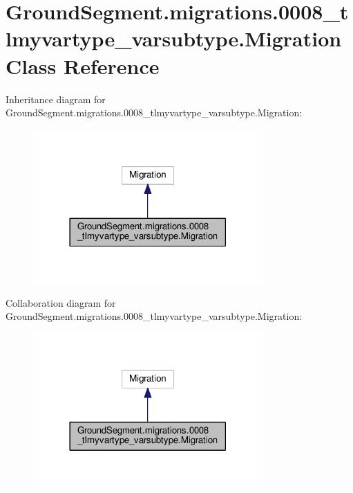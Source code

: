 \hypertarget{class_ground_segment_1_1migrations_1_10008__tlmyvartype__varsubtype_1_1_migration}{}\section{Ground\+Segment.\+migrations.0008\+\_\+tlmyvartype\+\_\+varsubtype.Migration Class Reference}
\label{class_ground_segment_1_1migrations_1_10008__tlmyvartype__varsubtype_1_1_migration}


Inheritance diagram for Ground\+Segment.\+migrations.0008\+\_\+tlmyvartype\+\_\+varsubtype.Migration\+:\nopagebreak
\begin{figure}[H]
\begin{center}
\leavevmode
\includegraphics[width=249pt]{class_ground_segment_1_1migrations_1_10008__tlmyvartype__varsubtype_1_1_migration__inherit__graph}
\end{center}
\end{figure}


Collaboration diagram for Ground\+Segment.\+migrations.0008\+\_\+tlmyvartype\+\_\+varsubtype.Migration\+:\nopagebreak
\begin{figure}[H]
\begin{center}
\leavevmode
\includegraphics[width=249pt]{class_ground_segment_1_1migrations_1_10008__tlmyvartype__varsubtype_1_1_migration__coll__graph}
\end{center}
\end{figure}
